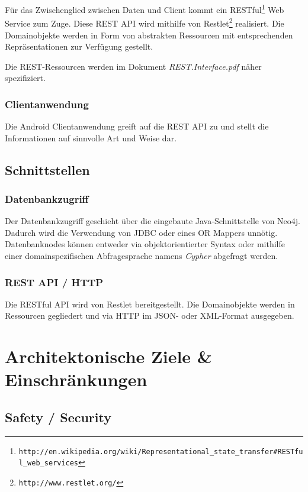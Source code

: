 \documentclass[10pt,a4paper]{scrartcl}
\begin{document}
Für das Zwischenglied zwischen Daten und Client kommt ein
RESTful\footnote{\texttt{http://en.wikipedia.org/wiki/Representational\_state\_transfer\#RESTful\_web\_services}}
Web Service zum Zuge. Diese REST API wird mithilfe von
Restlet\footnote{\texttt{http://www.restlet.org/}} realisiert. Die Domainobjekte werden in Form von
abstrakten Ressourcen mit entsprechenden Repräsentationen zur Verfügung gestellt.

Die REST-Ressourcen werden im Dokument \textit{REST.Interface.pdf} näher spezifiziert.

\subsubsection{Clientanwendung}

Die Android Clientanwendung greift auf die REST API zu und stellt die Informationen auf sinnvolle
Art und Weise dar.


\subsection{Schnittstellen}

\subsubsection{Datenbankzugriff}

Der Datenbankzugriff geschieht über die eingebaute Java-Schnittstelle von Neo4j. Dadurch wird die
Verwendung von JDBC oder eines OR Mappers unnötig. Datenbanknodes können entweder via
objektorientierter Syntax oder mithilfe einer domainspezifischen Abfragesprache namens
\textit{Cypher} abgefragt werden.

\subsubsection{REST API / HTTP}

Die RESTful API wird von Restlet bereitgestellt. Die Domainobjekte werden in Ressourcen gegliedert
und via HTTP im JSON- oder XML-Format ausgegeben.


\section{Architektonische Ziele \& Einschränkungen}

\subsection{Safety / Security}
\end{document}
